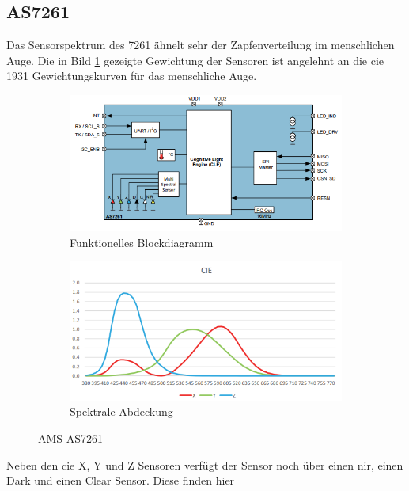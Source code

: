 \documentclass[11pt]{scrartcl}
\begin{document}
\subsection{AS7261}
Das Sensorspektrum des 7261 ähnelt sehr der Zapfenverteilung im menschlichen Auge. Die in Bild \ref{fig:AS7261_spectrum} gezeigte
Gewichtung der Sensoren ist angelehnt an die \ac{cie} 1931 Gewichtungskurven für das menschliche Auge. 
\begin{figure}[H]
    \centering
    \begin{subfigure}[b]{0.49\textwidth}
        \includegraphics[width=\textwidth]{images/AS7261_functional_blockdiagram.png}
        \caption{Funktionelles Blockdiagramm}
    \end{subfigure}
    \hfill 
    \begin{subfigure}[b]{0.49\textwidth}
        \includegraphics[width=\textwidth]{images/AS7261_spectrum.png}
        \caption{Spektrale Abdeckung}\label{fig:AS7261_spectrum}
    \end{subfigure}
    \caption{AMS AS7261 \cite{datasheet61}}\label{fig:AS7261}
\end{figure}
\noindent
Neben den \ac{cie} X, Y und Z Sensoren verfügt der Sensor noch über einen \ac{nir}, einen Dark und einen Clear Sensor. Diese finden hier
\end{document}
